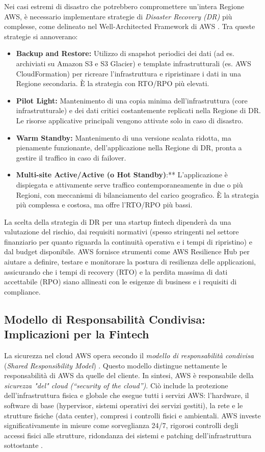 Nei casi estremi di disastro che potrebbero compromettere un'intera Regione AWS, è necessario implementare strategie di \textit{Disaster Recovery (DR)} più complesse, come delineato nel Well-Architected Framework di AWS \cite{awsWellArchitected}. Tra queste strategie si annoverano:
\begin{itemize}
    \item \textbf{Backup and Restore:} Utilizzo di snapshot periodici dei dati (ad es. archiviati su Amazon S3 e S3 Glacier) e template infrastrutturali (es. AWS CloudFormation) per ricreare l'infrastruttura e ripristinare i dati in una Regione secondaria. È la strategia con RTO/RPO più elevati.
    \item \textbf{Pilot Light:} Mantenimento di una copia minima dell'infrastruttura (core infrastrutturale) e dei dati critici costantemente replicati nella Regione di DR. Le risorse applicative principali vengono attivate solo in caso di disastro.
    \item \textbf{Warm Standby:} Mantenimento di una versione scalata ridotta, ma pienamente funzionante, dell'applicazione nella Regione di DR, pronta a gestire il traffico in caso di failover.
    \item \textbf{Multi-site Active/Active (o Hot Standby)}:** L'applicazione è dispiegata e attivamente serve traffico contemporaneamente in due o più Regioni, con meccanismi di bilanciamento del carico geografico. È la strategia più complessa e costosa, ma offre l'RTO/RPO più bassi.
\end{itemize}
La scelta della strategia di DR per una startup fintech dipenderà da una valutazione del rischio, dai requisiti normativi (spesso stringenti nel settore finanziario per quanto riguarda la continuità operativa e i tempi di ripristino) e dal budget disponibile. AWS fornisce strumenti come AWS Resilience Hub \cite{aws-resilience} per aiutare a definire, testare e monitorare la postura di resilienza delle applicazioni, assicurando che i tempi di recovery (RTO) e la perdita massima di dati accettabile (RPO) siano allineati con le esigenze di business e i requisiti di compliance.

\subsection{Modello di Responsabilità Condivisa: Implicazioni per la Fintech}
\label{sec:shared-responsibility-fintech}

La sicurezza nel cloud AWS opera secondo il \textit{modello di responsabilità condivisa} (\textit{Shared Responsibility Model}) \cite{aws-shared-responsibility}. Questo modello distingue nettamente le responsabilità di AWS da quelle del cliente. In sintesi, AWS è responsabile della \textit{sicurezza "del" cloud (“security of the cloud”)}. Ciò include la protezione dell'infrastruttura fisica e globale che esegue tutti i servizi AWS: l'hardware, il software di base (hypervisor, sistemi operativi dei servizi gestiti), la rete e le strutture fisiche (data center), compresi i controlli fisici e ambientali. AWS investe significativamente in misure come sorveglianza 24/7, rigorosi controlli degli accessi fisici alle strutture, ridondanza dei sistemi e patching dell'infrastruttura sottostante \cite{aws-shared-responsibility}.

